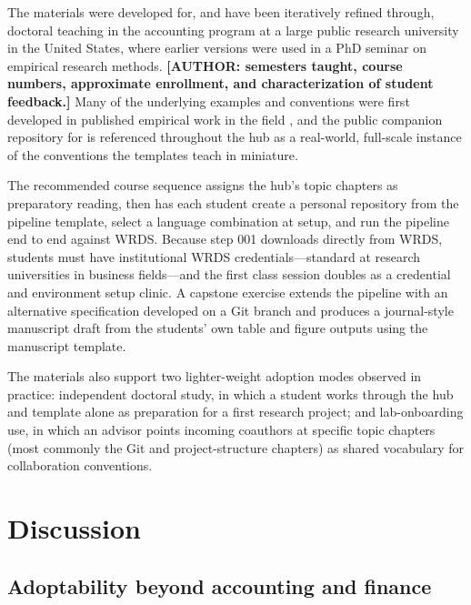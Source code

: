 \documentclass[12pt]{article}
\newcommand{\institution}{a large public research university in the United States}
\newcommand{\institution}{the University of Kansas}
\begin{document}
The materials were developed for, and have been iteratively refined
through, doctoral teaching in the accounting program at \institution,
where earlier versions were used in a PhD seminar on empirical research
methods.
\textbf{[AUTHOR: semesters taught, course numbers, approximate
enrollment, and characterization of student feedback.]}
Many of the underlying examples and conventions were first developed in
published empirical work in the field
\citep{weisbrod2019stockholders, bochkay2022roles, larocqueconsensus},
and the public companion repository for \citet{larocqueconsensus} is
referenced throughout the hub as a real-world, full-scale instance of the
conventions the templates teach in miniature.

The recommended course sequence assigns the hub's topic chapters as
preparatory reading, then has each student create a personal repository
from the pipeline template, select a language combination at setup, and
run the pipeline end to end against WRDS. Because step 001 downloads
directly from WRDS, students must have institutional WRDS
credentials---standard at research universities in business
fields---and the first class session doubles as a credential and
environment setup clinic. A capstone exercise extends the pipeline with
an alternative specification developed on a Git branch and produces a
journal-style manuscript draft from the students' own table and figure
outputs using the manuscript template.

The materials also support two lighter-weight adoption modes observed in
practice: independent doctoral study, in which a student works through
the hub and template alone as preparation for a first research project;
and lab-onboarding use, in which an advisor points incoming coauthors at
specific topic chapters (most commonly the Git and project-structure
chapters) as shared vocabulary for collaboration conventions.

\section{Discussion}
\label{sec:discussion}

\subsection{Adoptability beyond accounting and finance}
\end{document}

